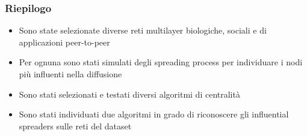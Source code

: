 \begin{frame}
    \frametitle{Riepilogo}
    \begin{itemize}
        \item Sono state selezionate diverse reti multilayer biologiche, sociali 
            e di applicazioni peer-to-peer
        \item Per ognuna sono stati simulati degli spreading process per 
            individuare i nodi più influenti nella diffusione
        \item Sono stati selezionati e testati diversi algoritmi di centralità
        \item Sono stati individuati due algoritmi in grado di riconoscere 
            gli influential spreaders sulle reti del dataset
    \end{itemize}
\end{frame}